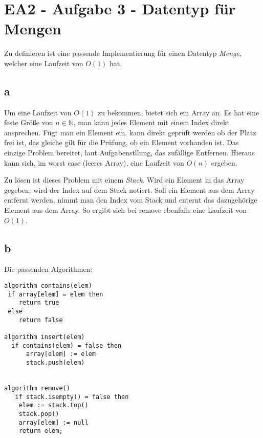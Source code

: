 \documentclass[12pt]{article}
\newcommand{\N}{\mathbb{N}}
\begin{document}
\newpage
\section*{EA2 - Aufgabe 3 - Datentyp für Mengen}
Zu definieren ist eine passende Implementierung für einen Datentyp \textit{Menge}, welcher eine Laufzeit von $O(1)$ hat.
\subsection*{a}
Um eine Laufzeit von $O(1)$ zu bekommen, bietet sich ein Array an. Es hat eine feste Größe von $n \in \N$, man kann jedes Element mit einem Index direkt ansprechen.
Fügt man ein Element ein, kann direkt geprüft werden ob der Platz frei ist, das gleiche gilt für die Prüfung, ob ein Element vorhanden ist. Das einzige Problem bereitet, laut 
Aufgabenstllung, das zufällige Entfernen. Hieraus kann sich, im worst case (leeres Array), eine Laufzeit von $O(n)$ ergeben.

Zu lösen ist dieses Problem mit einem \textit{Stack}. Wird ein Element in das Array gegeben, wird der Index auf dem Stack notiert. Soll ein Element aus dem Array entfernt werden,
nimmt man den Index vom Stack und enternt das dazugehörige Element aus dem Array. So ergibt sich bei remove ebenfalls eine Laufzeit von $O(1)$.

\subsection*{b}
Die passenden Algorithmen:

\begin{lstlisting}
algorithm contains(elem)
 if array[elem] = elem then
    return true
 else
    return false

algorithm insert(elem)  
  if contains(elem) = false then
      array[elem] := elem
      stack.push(elem)
      

algorithm remove()
   if stack.isempty() = false then
    elem := stack.top()
    stack.pop()
    array[elem] := null
    return elem;
\end{lstlisting}

\newpage
\end{document}
